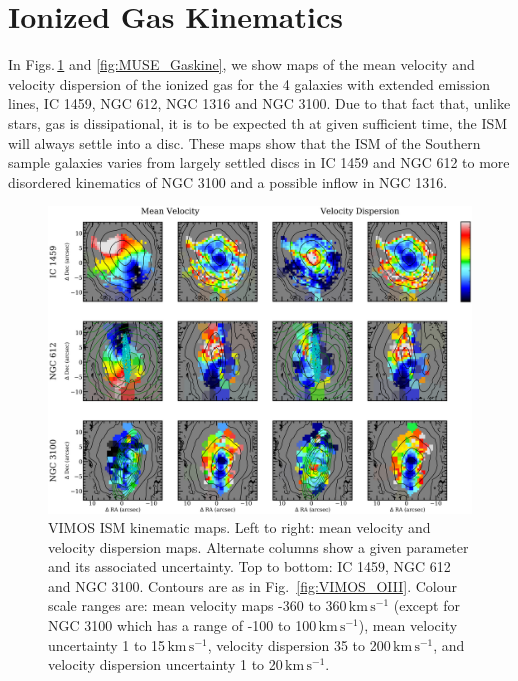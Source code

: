 		
		





\section{Ionized Gas Kinematics}
	\label{sec:GasKin}
	In Figs.\,\ref{fig:VIMOS_Gaskine} and \ref{fig:MUSE_Gaskine}, we show maps of the mean velocity and velocity dispersion of the ionized gas for the 4 galaxies with extended emission lines, IC 1459, NGC 612, NGC 1316 and NGC 3100. Due to that fact that, unlike stars, gas is dissipational, it is to be expected th at given sufficient time, the ISM will always settle into a disc. These maps show that the ISM of the Southern sample galaxies varies from largely settled discs in IC 1459 and NGC 612 to more disordered kinematics of NGC 3100 and a possible inflow in NGC 1316.

	\begin{figure}
		\centering
		\includegraphics[height=0.47\textheight]{chapter5/vimos/kin.png}
		\caption[VIMOS ISM kinematic maps]{VIMOS ISM kinematic maps. Left to right: mean velocity and velocity dispersion maps. Alternate columns show a given parameter and its associated uncertainty. Top to bottom: IC 1459, NGC 612 and NGC 3100. Contours are as in Fig.\ \ref{fig:VIMOS_OIII}. Colour scale ranges are: mean velocity maps -360 to 360\,$\mathrm{km \, s^{-1}}$ (except for NGC 3100 which has a range of -100 to 100\,$\mathrm{km \, s^{-1}}$), mean velocity uncertainty 1 to 15\,$\mathrm{km \, s^{-1}}$, velocity dispersion 35 to 200\,$\mathrm{km \, s^{-1}}$, and velocity dispersion uncertainty 1 to 20\,$\mathrm{km \, s^{-1}}$.} 
		\label{fig:VIMOS_Gaskine}
	\end{figure}

